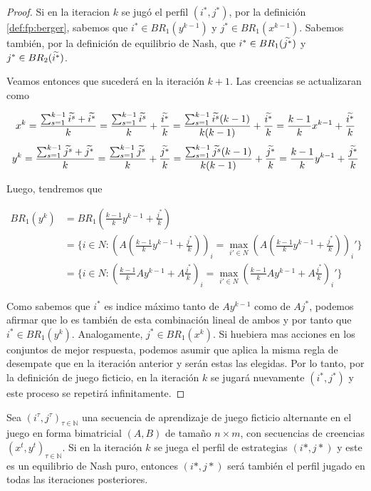 \begin{proof}
    Si en la iteracion $k$ se jugó el perfil $(i^*, j^*)$, por la definición \ref{def:fp:berger}, sabemos que $i^* \in BR_1(y^{k-1})$ y $j^* \in BR_1(x^{k-1})$. Sabemos también, por la definición de equilibrio de Nash, que $i^* \in BR_1(\widetilde{j^*})$ y $j^* \in BR_2(\widetilde{i^*})$.

    Veamos entonces que sucederá en la iteración $k+1$. Las creencias se actualizaran como

    \[
        x^k = \frac{\sum_{s=1}^{k-1}{\widetilde{i^s}} + \widetilde{i^*}}{k}
            = \frac{\sum_{s=1}^{k-1}{\widetilde{i^s}}}{k} + \frac{\widetilde{i^*}}{k}
            = \frac{\sum_{s=1}^{k-1}{\widetilde{i^s}}(k-1)}{k(k-1)} + \frac{\widetilde{i^*}}{k}
            = \frac{k - 1}{k} x^{k-1} + \frac{\widetilde{i^*}}{k}
    \]
    \[
        y^k = \frac{\sum_{s=1}^{k-1}{\widetilde{j^s}} + \widetilde{j^*}}{k}
            = \frac{\sum_{s=1}^{k-1}{\widetilde{j^s}}}{k} + \frac{\widetilde{j^*}}{k}
            = \frac{\sum_{s=1}^{k-1}{\widetilde{j^s}}(k-1)}{k(k-1)} + \frac{\widetilde{j^*}}{k}
            = \frac{k - 1}{k} y^{k-1} + \frac{\widetilde{j^*}}{k}
    \]

    Luego, tendremos que

    \begin{align*}
        BR_1(y^k) &= BR_1(\frac{k - 1}{k} y^{k-1} + \frac{j^*}{k}) \\
        &= \{i \in N : (A(\frac{k - 1}{k} y^{k-1} + \frac{j^*}{k}))_i = \max_{i' \in N} (A(\frac{k - 1}{k} y^{k-1} + \frac{j^*}{k}))_i'\}\\
        &= \{i \in N : (\frac{k - 1}{k} Ay^{k-1} + A\frac{j^*}{k})_i = \max_{i' \in N} (\frac{k - 1}{k} Ay^{k-1} + A\frac{j^*}{k})_i'\}
    \end{align*}

    Como sabemos que $i^*$ es indice máximo tanto de $Ay^{k-1}$ como de $Aj^*$, podemos afirmar que lo es también de esta combinación lineal de ambos y por tanto que $i^* \in BR_1(y^k)$. Analogamente, $j^* \in BR_1(x^k)$. Si huebiera mas acciones en los conjuntos de mejor respuesta, podemos asumir que aplica la misma regla de desempate que en la iteración anterior y serán estas las elegidas. Por lo tanto, por la definición de juego ficticio, en la iteración $k$ se jugará nuevamente $(i^*, j^*)$ y este proceso se repetirá infinitamente.

\end{proof}

\begin{theorem}
    Sea $(i^\tau, j^\tau)_{\tau \in \mathbb{N}}$ una secuencia de aprendizaje de juego ficticio alternante en el juego en forma bimatricial $(A, B)$ de tamaño $n \times m$, con secuencias de creencias $(x^t, y^t)_{\tau \in \mathbb{N}}$. Si en la iteración $k$ se juega el perfil de estrategias $(i*, j*)$ y este es un equilibrio de Nash puro, entonces $(i*, j*)$ será también el perfil jugado en todas las iteraciones posteriores.
\end{theorem}

